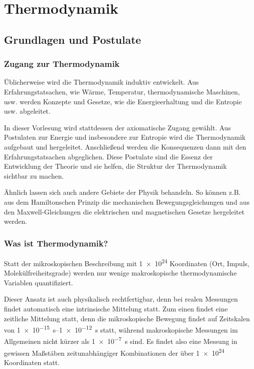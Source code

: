 
\chapter{Thermodynamik}

\section{Grundlagen und Postulate}
\subsection{Zugang zur Thermodynamik}

Üblicherweise wird die Thermodynamik induktiv entwickelt. Aus Erfahrungstatsachen, wie Wärme, Temperatur, thermodynamische Maschinen, usw. werden Konzepte und Gesetze, wie die Energieerhaltung und die Entropie usw. abgeleitet.

In dieser Vorlesung wird stattdessen der axiomatische Zugang gewählt.
Aus Postulaten zur Energie und insbesondere zur Entropie wird die Thermodynamik aufgebaut und hergeleitet.
Anschließend werden die Konsequenzen dann mit den Erfahrungstatsachen abgeglichen.
Diese Postulate sind die Essenz der Entwicklung der Theorie und sie helfen, die Struktur der Thermodynamik sichtbar zu machen.

Ähnlich lassen sich auch andere Gebiete der Physik behandeln.
So können z.B. aus dem Hamiltonschen Prinzip die mechanischen Bewegungsgleichungen und aus den Maxwell-Gleichungen die elektrischen und magnetischen Gesetze hergeleitet werden.


\subsection{Was ist Thermodynamik?}

Statt der mikroskopischen Beschreibung mit \num{1e24} Koordinaten (Ort, Impuls, Molekülfreiheitsgrade) werden nur wenige makroskopische thermodynamische Variablen quantifiziert.

Dieser Ansatz ist auch physikalisch rechtfertigbar, denn bei realen Messungen findet automatisch eine intrinsische Mittelung statt.
Zum einen findet eine zeitliche Mittelung statt, denn die mikroskopische Bewegung findet auf Zeitskalen von \SIrange{1e-15}{1e-12}{\s} statt, während makroskopische Messungen im Allgemeinen nicht kürzer als \SI{1e-7}{\s} sind.
Es findet also eine Messung in gewissen Maßstäben zeitunabhängiger Kombinationen der über \num{1e24} Koordinaten statt.


